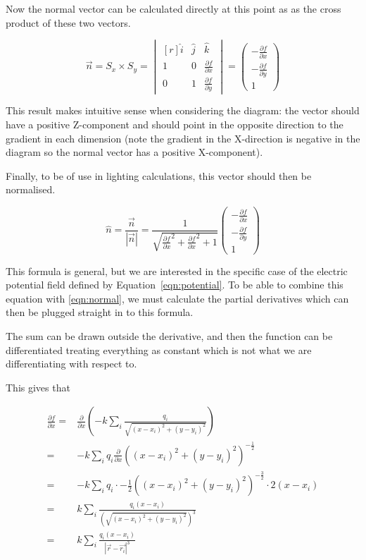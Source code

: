 \documentclass{article} %
\begin{document}
 Now the normal vector can be calculated directly at this point as as the cross product of these two vectors.

$$\vec{n} = S_x \times S_y = \begin{vmatrix*}[r]
\hat{i} & \hat{j} & \hat{k} \\
1 & 0 & \frac{\partial f}{\partial x} \\
0 & 1 & \frac{\partial f}{\partial y}
\end{vmatrix*} =
\begin{pmatrix}-\frac{\partial f}{\partial x} \\ -\frac{\partial f}{\partial y} \\ 1\end{pmatrix}
$$

This result makes intuitive sense when considering the diagram: the vector should have a positive Z-component and should point in the opposite direction to the gradient in each dimension (note the gradient in the X-direction is negative in the diagram so the normal vector has a positive X-component).

Finally, to be of use in lighting calculations, this vector should then be normalised.

\begin{equation}\hat{n} = \frac{\vec{n}}{|\vec{n}|} =
\frac{1}{\sqrt{
    \frac{\partial f}{\partial x}^2 +
    \frac{\partial f}{\partial x}^2 +
    1
}}
\begin{pmatrix}-\frac{\partial f}{\partial x} \\ -\frac{\partial f}{\partial y} \\ 1\end{pmatrix}
\label{eqn:normal}\end{equation}

This formula is general, but we are interested in the specific case of the electric potential field defined by Equation~\ref{eqn:potential}. To be able to combine this equation with \ref{eqn:normal}, we must calculate the partial derivatives which can then be plugged straight in to this formula.

The sum can be drawn outside the derivative, and then the function can be differentiated treating everything as constant which is not what we are differentiating with respect to.

This gives that

\begin{align*}
\frac{\partial f}{\partial x} = &\frac{\partial}{\partial x}(-k\sum_{i}\frac{q_i}{\sqrt{(x-x_i)^2 + (y-y_i)^2}})\\
=&-k\sum_{i}q_i\frac{\partial}{\partial x}((x-x_i)^2 + (y-y_i)^2)^{-\frac{1}{2}} \\
=&-k\sum_{i}q_i \cdot -\frac{1}{2} ((x-x_i)^2 + (y-y_i)^2)^{-\frac{3}{2}} \cdot 2(x-x_i) \\
=&k\sum_{i}\frac{q_i(x-x_i)}{(\sqrt{(x-x_i)^2 + (y-y_i)^2})^3} \\
=&k\sum_{i}\frac{q_i(x-x_i)}{|\vec{r}-\vec{r_i}|^3}
\end{align*}
\end{document}
